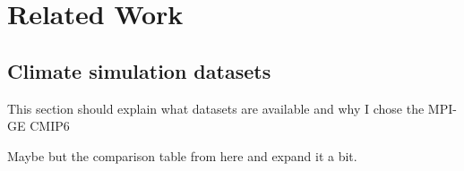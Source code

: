 \chapter{Related Work}
\label{ch:related_work}

\section{Climate simulation datasets}


This section should explain what datasets are available and why I chose the MPI-GE CMIP6 \cite{olonscheck_new_2023}

Maybe but the comparison table from \cite{olonscheck_new_2023} here and expand it a bit. 



% 
% 	
% 
% 
% 
% 
% 
